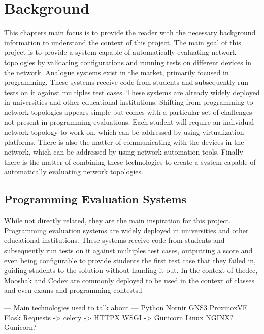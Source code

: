 
\chapter{Background}


\label{ChapterBackground}


This chapters main focus is to provide the reader with the necessary background information to understand the context of
this project. The main goal of this project is to provide a system capable of automatically evaluating network topologies 
by validating configurations and running tests on different devices in the network. Analogue systems exist in the market,
primarily focused in programming. These systems receive code from students and subsequently run tests on it against 
multiples test cases. These systems are already widely deployed in universities and other educational institutions. 
Shifting from programming to network topologies appears simple but comes with a particular 
set of challenges not present in programming evaluations. Each student will require an individual network topology to work 
on, which can be addressed by using virtualization platforms. There is also the matter of communicating with the devices 
in the network, which can be addressed by using network automation tools. Finally there is the matter of combining these 
technologies to create a system capable of automatically evaluating network topologies.

\section{Programming Evaluation Systems}
While not directly related, they are the main inspiration for this project. Programming evaluation systems are widely
deployed in universities and other educational institutions. These systems receive code from students and subsequently run
tests on it against multiples test cases, outputting a score and even being configurable to provide students the first test
case that they failed in, guiding students to the solution without handing it out. In the context of the\ac{dcc}, Mooshak and Codex are commonly deployed to be used in the context of classes and even 
exams and programming contests.l



--- Main technologies used to talk about ---
Python
Nornir
GNS3
ProxmoxVE
Flask
Requests -> celery -> HTTPX
WSGI -> Gunicorn
Linux
NGINX?
Gunicorn?